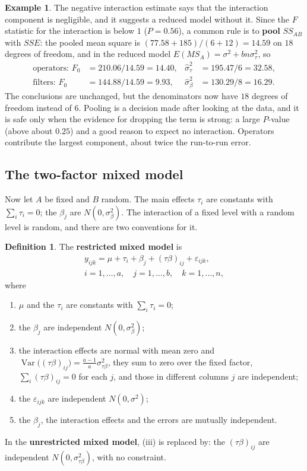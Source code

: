 \documentclass[11pt,a4paper]{article}
\numberwithin{equation}{section}
\DeclareMathOperator{\Var}{Var}
\theoremstyle{definition}
\newtheorem{defn}[thm]{Definition}
\newtheorem{exa}[thm]{Example}
\begin{document}
\begin{exa}
The negative interaction estimate says that the interaction component is negligible, and it suggests a reduced model without it. Since the $F$
statistic for the interaction is below $1$ ($P = 0.56$), a common rule is to \textbf{pool} $SS_{AB}$ with $SSE$: the pooled mean square is
$(77.58 + 185)/(6 + 12) = 14.59$ on $18$ degrees of freedom, and in the reduced model $E(MS_A) = \sigma^2 + bn\sigma^2_\tau$, so
\begin{align*}
\text{operators: } F_0 &= 210.06/14.59 = 14.40 , & \hat\sigma^2_\tau &= 195.47/6 = 32.58 , \\
\text{filters: } F_0 &= 144.88/14.59 = 9.93 , & \hat\sigma^2_\beta &= 130.29/8 = 16.29 .
\end{align*}
The conclusions are unchanged, but the denominators now have $18$ degrees of freedom instead of $6$. Pooling is a decision made after looking at the data,
and it is safe only when the evidence for dropping the term is strong: a large $P$-value (above about $0.25$) and a good reason to expect no
interaction. Operators contribute the largest component, about twice the run-to-run error.
\end{exa}

\subsection{The two-factor mixed model}
Now let $A$ be fixed and $B$ random. The main effects $\tau_i$ are constants with $\sum_i\tau_i = 0$; the $\beta_j$ are $N(0, \sigma^2_\beta)$. The interaction of a fixed level with a random level is
random, and there are two conventions for it.

\begin{defn}
The \textbf{restricted mixed model} is
\begin{gather*}
y_{ijk} = \mu + \tau_i + \beta_j + (\tau\beta)_{ij} + \varepsilon_{ijk} , \\
i = 1, \dots, a , \quad j = 1, \dots, b , \quad k = 1, \dots, n ,
\end{gather*}
where
\begin{enumerate}[label=(\roman*)]
\item $\mu$ and the $\tau_i$ are constants with $\sum_i\tau_i = 0$;
\item the $\beta_j$ are independent $N(0, \sigma^2_\beta)$;
\item the interaction effects are normal with mean zero and $\Var\bigl((\tau\beta)_{ij}\bigr) = \frac{a - 1}a\sigma^2_{\tau\beta}$, they sum to zero over the fixed factor,
$\sum_i(\tau\beta)_{ij} = 0$ for each $j$, and those in different columns $j$ are independent;
\item the $\varepsilon_{ijk}$ are independent $N(0, \sigma^2)$;
\item the $\beta_j$, the interaction effects and the errors are mutually independent.
\end{enumerate}
In the \textbf{unrestricted mixed model}, (iii) is replaced by: the $(\tau\beta)_{ij}$ are independent $N(0, \sigma^2_{\tau\beta})$, with no constraint.
\end{defn}
\end{document}
